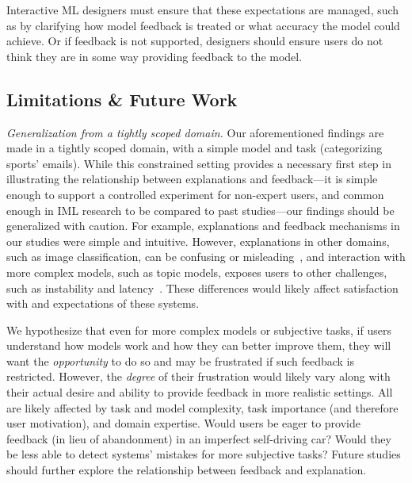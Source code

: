 Interactive ML designers must ensure that these expectations are managed, such as by clarifying how model feedback is treated or what accuracy the model could achieve. Or if feedback is not supported, designers should ensure users do not think they are in some way providing feedback to the model. %


\subsection{Limitations \& Future Work}

\emph{Generalization from a tightly scoped domain.}
Our aforementioned findings are made in a tightly scoped domain, with a simple model and task (categorizing sports' emails). 
While this constrained setting provides a necessary first step in illustrating the relationship between explanations and feedback---it is simple enough to support a controlled experiment for non-expert users, and common enough in IML research to be compared to past studies---our findings should be generalized with caution. 
For example, explanations and feedback mechanisms in our studies were simple and intuitive. However, explanations in other domains, such as image classification, can be confusing or misleading~\cite{Adebayo2018SanityMaps}, and interaction with more complex models, such as topic models, exposes users to other challenges, such as instability and latency~\cite{Smith2018ClosingSystem}. These differences would likely affect satisfaction with and expectations of these systems. 
%

We hypothesize that even for more complex models or subjective tasks, 
if users understand how models work and how they can better improve them, they will want the \textit{opportunity} to do so and may be frustrated if such feedback is restricted.
However, the \emph{degree} of their frustration would likely vary along with their actual desire and ability to provide feedback in more realistic settings. All are likely affected by  task and model complexity, task importance (and therefore user motivation), and domain expertise.
Would users be eager to provide feedback (in lieu of abandonment) in an imperfect self-driving car? Would they be less able to detect systems' mistakes for more subjective tasks?
Future studies should further explore the relationship between feedback and explanation. 


